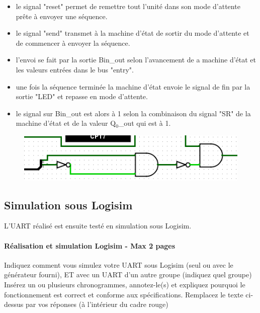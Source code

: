 \documentclass[a4paper]{article} %
\begin{document}
\begin{tcolorbox}[colframe=Monokaimagenta,colback=white, breakable, enhanced]
\begin{itemize}
	\item le signal "reset" permet de remettre tout l'unité dans son mode d'attente prête à envoyer une séquence.
	\item le signal "send" transmet à la machine d'état de sortir du mode d'attente et de commencer à envoyer la séquence.
	\item l'envoi se fait par la sortie Bin\_out selon l'avancement de a machine d'état et les valeurs entrées dans le bus "entry".
	\item une fois la séquence terminée la machine d'état envoie le signal de fin par la sortie "LED" et repasse en mode d'attente.
	\item le signal sur Bin\_out est alors à 1 selon la combinaison du signal "SR" de la machine d'état et de la valeur Q$_0$\_out qui est à 1.
\end{itemize}
\begin{figure}[H]
	\centering
	\includegraphics[scale=0.5]{src/bin_out_1}
	\label{fig:bin_out_1}
\end{figure}




\end{tcolorbox}
 \subsection{Simulation sous Logisim}
L’UART réalisé est ensuite testé en simulation sous Logisim.
\begin{tcolorbox}[colframe=Monokaimagenta,colback=white, breakable, enhanced]
\paragraph{Réalisation et simulation Logisim - Max 2 pages}
Indiquez comment vous simulez votre UART sous Logisim (seul ou avec le générateur fourni), ET avec un UART d’un autre groupe (indiquez quel groupe)
Insérez un ou plusieurs chronogrammes, annotez-le(s) et expliquez pourquoi le fonctionnement est correct et conforme aux spécifications.
Remplacez le texte ci-dessus par vos réponses (à l’intérieur du cadre rouge)
\\
\end{tcolorbox}
\end{document}
